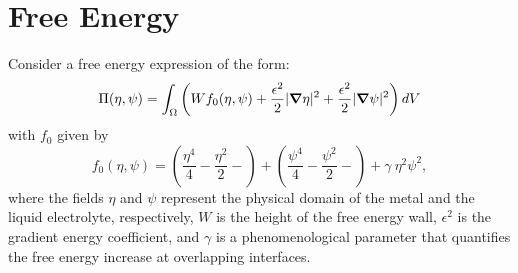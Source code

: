 \documentclass[10pt]{article}
\newcommand{\gv}[1]{\ensuremath{\mbox{\boldmath$ #1 $}}}
\newcommand{\grad}[1]{\gv{\nabla} #1}
\begin{document}
\section{Free Energy}
Consider a  free energy expression of the form:
\begin{equation}
  \Pi(\eta,\psi) = \int_{\Omega}  \left( W f_0(\eta,\psi)+ \frac{\epsilon^2}{2} |\grad \eta|^2 +  \frac{\epsilon^2}{2} |\grad \psi|^2 \right) dV
\end{equation}
\noindent with $f_0$ given by
\begin{equation}
 f_0(\eta,\psi) = \left( \frac{\eta^4}{4} - \frac{\eta^2}{2} -\right) + \left( \frac{\psi^4}{4} - \frac{\psi^2}{2} -\right) + \gamma ~\eta^2 \psi^2,
\end{equation}
\noindent where the fields $\eta$  and $\psi$ represent the physical domain of the metal and the liquid electrolyte, respectively, $W$ is the height of the free energy wall, $\epsilon^2$ is the gradient energy coefficient, and $\gamma$ is a phenomenological parameter that quantifies the free energy increase at overlapping interfaces.
\end{document}
